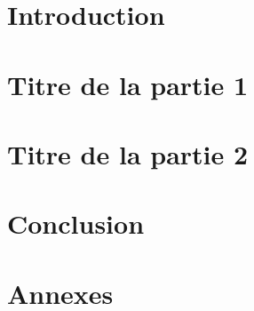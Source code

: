 \documentclass{myClass}
\begin{document}
\pagestyle{contentStarred}

\part*{Introduction}

\blankpage


\pagestyle{contentNormal}

\part[Titre affiché dans la table des matières]{Titre de la partie 1}


\blankpage

\part{Titre de la partie 2}

\blankpage


\pagestyle{contentStarred}

\part*{Conclusion}

\blankpage





\appendix
\pagestyle{contentAppendix}

\part*{Annexes}





\backmatter
\pagestyle{contentFrontBackmatter}



\end{document}
